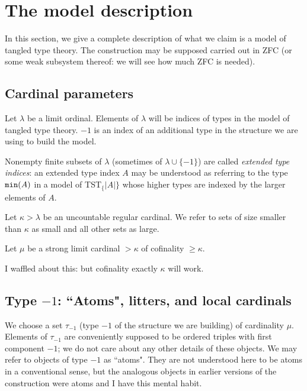 \documentclass[112pt]{article}
\begin{document}
\newpage




\section{The model description}

In this section, we give a complete description of what we claim is a model of tangled type theory.  The construction may be supposed carried out in ZFC (or some weak subsystem thereof:  we will see how much ZFC is needed).

\subsection{Cardinal parameters}

Let $\lambda$ be a limit ordinal.  Elements of $\lambda$ will be indices of types in the model of tangled type theory.  $-1$ is an index of an additional type in the structure we are using to build the model.

Nonempty finite subsets of $\lambda$ (sometimes of $\lambda \cup \{-1\}$) are called {\em extended type indices\/}:  an extended type index $A$ may be understood as referring to the type ${\tt min}(A)$ in a model of TST$_\{|A|\}$ whose higher types are indexed by the larger elements of $A$.

Let $\kappa>\lambda$ be an uncountable regular cardinal.  We refer to sets of size smaller than $\kappa$ as small and all other sets as large.

Let $\mu$ be a strong limit cardinal $>\kappa$ of cofinality $\geq \kappa$.  

I waffled about this:  but cofinality exactly $\kappa$ will work.

\subsection{Type $-1$:  ``Atoms", litters, and local cardinals}

We choose a set $\tau_{-1}$ (type $-1$ of the structure we are building) of cardinality $\mu$.  Elements of $\tau_{-1}$ are conveniently supposed to be ordered triples with first component $-1$;  we do not care about any other details of these objects.  We may refer to objects of type $-1$ as ``atoms".  They are not understood here to be atoms in a conventional sense, but the analogous objects in earlier versions of the construction were atoms and I have this mental habit.
\end{document}
